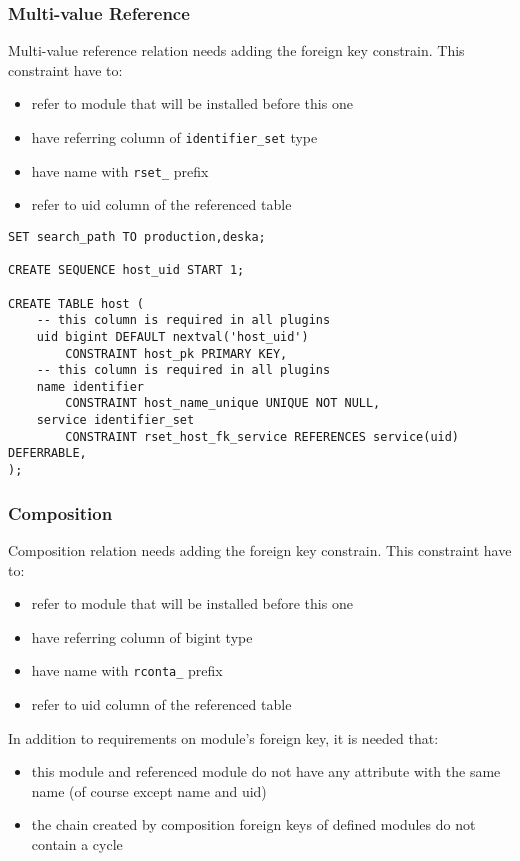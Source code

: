 \documentclass[deska]{subfiles}
\begin{document}
\subsubsection{Multi-value Reference}
Multi-value reference relation needs adding the foreign key constrain. This constraint have to:
\begin{itemize}
    \item refer to module that will be installed before this one
    \item have referring column of {\tt identifier\_set} type
    \item have name with {\tt rset\_} prefix
    \item refer to uid column of the referenced table
\end{itemize}

\begin{verbatim}
SET search_path TO production,deska;

CREATE SEQUENCE host_uid START 1;

CREATE TABLE host (
    -- this column is required in all plugins
    uid bigint DEFAULT nextval('host_uid')
        CONSTRAINT host_pk PRIMARY KEY,
    -- this column is required in all plugins
    name identifier
        CONSTRAINT host_name_unique UNIQUE NOT NULL,
    service identifier_set
        CONSTRAINT rset_host_fk_service REFERENCES service(uid) DEFERRABLE,
);
\end{verbatim}

\subsubsection{Composition}
Composition relation needs adding the foreign key constrain. This constraint have to:
\begin{itemize}
    \item refer to module that will be installed before this one
    \item have referring column of bigint type
    \item have name with {\tt rconta\_} prefix
    \item refer to uid column of the referenced table
\end{itemize}
In addition to requirements on module's foreign key, it is needed that:
\begin{itemize}
    \item this module and referenced module do not have any attribute with the same name (of course except name and uid)
    \item the chain created by composition foreign keys of defined modules do not contain a cycle
\end{itemize}
\end{document}

